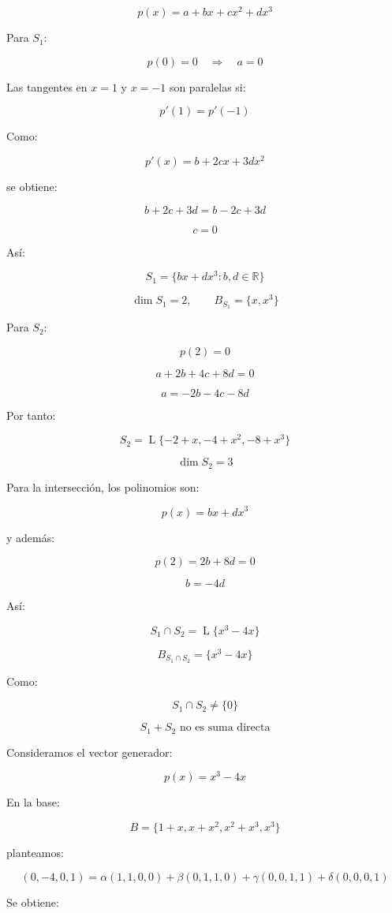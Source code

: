 \documentclass[11pt,a4paper]{article}
\newcommand{\R}{\mathbb{R}}
\newcommand{\Span}{\operatorname{L}}
\newcommand{\dimn}{\operatorname{dim}}
\begin{document}
	\[
	p(x)=a+bx+cx^2+dx^3
	\]

	Para $S_1$:

	\[
	p(0)=0
	\quad\Longrightarrow\quad
	a=0
	\]

	Las tangentes en $x=1$ y $x=-1$ son paralelas si:

	\[
	p'(1)=p'(-1)
	\]

	Como:

	\[
	p'(x)=b+2cx+3dx^2
	\]

	se obtiene:

	\[
	b+2c+3d
	=
	b-2c+3d
	\]

	\[
	c=0
	\]

	Así:

	\[
	S_1=
	\{bx+dx^3:b,d\in\R\}
	\]

	\[
	\boxed{
	\dimn S_1=2,
	\qquad
	B_{S_1}=\{x,x^3\}
	}
	\]

	Para $S_2$:

	\[
	p(2)=0
	\]

	\[
	a+2b+4c+8d=0
	\]

	\[
	a=-2b-4c-8d
	\]

	Por tanto:

	\[
	S_2=
	\Span\{-2+x,-4+x^2,-8+x^3\}
	\]

	\[
	\boxed{
	\dimn S_2=3
	}
	\]

	Para la intersección, los polinomios son:

	\[
	p(x)=bx+dx^3
	\]

	y además:

	\[
	p(2)=2b+8d=0
	\]

	\[
	b=-4d
	\]

	Así:

	\[
	S_1\cap S_2
	=
	\Span\{x^3-4x\}
	\]

	\[
	\boxed{
	B_{S_1\cap S_2}
	=
	\{x^3-4x\}
	}
	\]

	Como:

	\[
	S_1\cap S_2\neq\{0\}
	\]

	\[
	\boxed{
	S_1+S_2\text{ no es suma directa}
	}
	\]

	Consideramos el vector generador:

	\[
	p(x)=x^3-4x
	\]

	En la base:

	\[
	B=
	\{1+x,x+x^2,x^2+x^3,x^3\}
	\]

	planteamos:

	\[
	(0,-4,0,1)
	=
	\alpha(1,1,0,0)
	+\beta(0,1,1,0)
	+\gamma(0,0,1,1)
	+\delta(0,0,0,1)
	\]

	Se obtiene:
\end{document}
